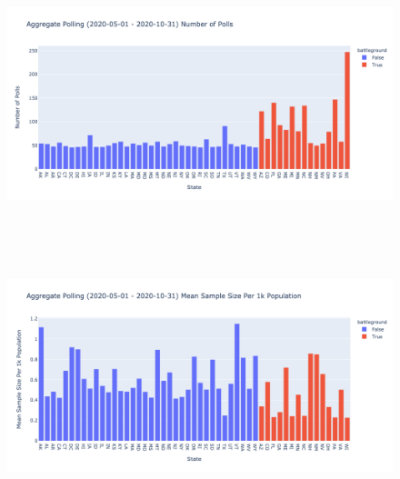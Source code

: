 \begin{figure}[H]
    \centering
    \includegraphics[height=20em]{figures/aggregate_polling_2020-05-01_-_2020-10-31_number_of_polls.png}
    \label{fig:aggregate_polling_2020-05-01_-_2020-10-31_number_of_polls}
\end{figure}


\begin{figure}[H]
    \centering
    \includegraphics[height=20em]{figures/aggregate_polling_2020-05-01_-_2020-10-31_mean_sample_size_per_1k_population.png}
    \label{fig:aggregate_polling_2020-05-01_-_2020-10-31_mean_sample_size_per_1k_population}
\end{figure}
